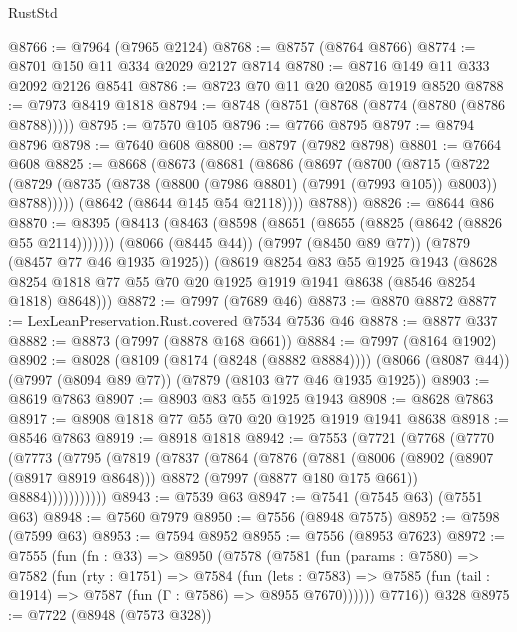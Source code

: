 \begin{lexlean}{RustStd}
\begin{coremodule}
{\begin{coremodule}
{{{{{{{{{{{{{{{{{{{{{{{{{{{{{{{{{{{{{{{{{{{@8766 := @7964 (@7965 @2124)
@8768 := @8757 (@8764 @8766)
@8774 := @8701 @150 @11 @334 @2029 @2127 @8714
@8780 := @8716 @149 @11 @333 @2092 @2126 @8541
@8786 := @8723 @70 @11 @20 @2085 @1919 @8520
@8788 := @7973 @8419 @1818
@8794 := @8748 (@8751 (@8768 (@8774 (@8780 (@8786 @8788)))))
@8795 := @7570 @105
@8796 := @7766 @8795
@8797 := @8794 @8796
@8798 := @7640 @608
@8800 := @8797 (@7982 @8798)
@8801 := @7664 @608
@8825 := @8668
    (@8673
      (@8681
        (@8686
          (@8697
            (@8700
              (@8715
                (@8722
                  (@8729 (@8735 (@8738 (@8800 (@7986 @8801) (@7991 (@7993 @105)) @8003)) @8788)))))
            (@8642 (@8644 @145 @54 @2118))))
        @8788))
@8826 := @8644 @86
@8870 := @8395
    (@8413
      (@8463 (@8598 (@8651 (@8655 (@8825 (@8642 (@8826 @55 @2114)))))))
      (@8066 (@8445 @44))
      (@7997 (@8450 @89 @77))
      (@7879 (@8457 @77 @46 @1935 @1925))
      (@8619
        @8254
        @83
        @55
        @1925
        @1943
        (@8628 @8254 @1818 @77 @55 @70 @20 @1925 @1919 @1941 @8638 (@8546 @8254 @1818) @8648)))
@8872 := @7997 (@7689 @46)
@8873 := @8870 @8872
@8877 := LexLeanPreservation.Rust.covered @7534 @7536 @46
@8878 := @8877 @337
@8882 := @8873 (@7997 (@8878 @168 @661))
@8884 := @7997 (@8164 @1902)
@8902 := @8028
    (@8109 (@8174 (@8248 (@8882 @8884))))
    (@8066 (@8087 @44))
    (@7997 (@8094 @89 @77))
    (@7879 (@8103 @77 @46 @1935 @1925))
@8903 := @8619 @7863
@8907 := @8903 @83 @55 @1925 @1943
@8908 := @8628 @7863
@8917 := @8908 @1818 @77 @55 @70 @20 @1925 @1919 @1941 @8638
@8918 := @8546 @7863
@8919 := @8918 @1818
@8942 := @7553
    (@7721
      (@7768
        (@7770
          (@7773
            (@7795
              (@7819
                (@7837
                  (@7864
                    (@7876
                      (@7881
                        (@8006
                          (@8902 (@8907 (@8917 @8919 @8648)))
                          @8872
                          (@7997 (@8877 @180 @175 @661))
                          @8884)))))))))))
@8943 := @7539 @63
@8947 := @7541 (@7545 @63) (@7551 @63)
@8948 := @7560 @7979
@8950 := @7556 (@8948 @7575)
@8952 := @7598 (@7599 @63)
@8953 := @7594 @8952
@8955 := @7556 (@8953 @7623)
@8972 := @7555
    (fun (fn : @33) =>
    @8950
      (@7578
        (@7581
          (fun (params : @7580) =>
          @7582
            (fun (rty : @1751) =>
            @7584
              (fun (lets : @7583) =>
              @7585 (fun (tail : @1914) => @7587 (fun (Γ : @7586) => @8955 @7670))))))
        @7716))
    @328
@8975 := @7722 (@8948 (@7573 @328))
}}}}}}}}}}}}}}}}}}}}}}}}}}}}}}}}}}}}}}}}}}}
\end{coremodule}}
\end{coremodule}
\end{lexlean}

